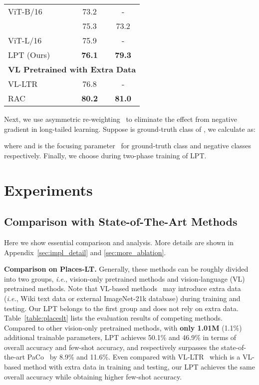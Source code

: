 \documentclass{article} \usepackage{iclr2023_conference,times}
\begin{document}
\begin{table}[h]
\begin{minipage}[t]{0.44\textwidth}
{{\begin{tabular}{l|cc}
      ViT-B/16 & 73.2 & - \\
      \citet{iscen2021class} & 75.3 & 73.2 \\
      ViT-L/16 & 75.9 & - \\
      LPT (Ours) & \textbf{76.1} & \textbf{79.3} \\
      \midrule
      \multicolumn{3}{l}{\textbf{VL Pretrained with Extra Data}} \\
      \midrule
      VL-LTR & 76.8 & - \\
      RAC & \textbf{80.2} & \textbf{81.0} \\
      \bottomrule
   \end{tabular}}}
   \label{table:comp_inat18}
\end{minipage}
\vspace{-1em}
\end{table}
Next, we use asymmetric re-weighting~\citep{ridnik2021asymmetric} to eliminate the effect from negative gradient in long-tailed learning.
Suppose  is ground-truth class of , we calculate  as:

where  and  is the focusing parameter~\citep{lin2017focal} for ground-truth class and negative classes respectively.
Finally, we choose  during two-phase training of LPT.

\section{Experiments}\label{sec:exp}
\vspace{-0.5em}


\subsection{Comparison with State-of-The-Art Methods}\label{sec:comp_sota}
\vspace{-0.5em}
Here we show essential comparison and analysis. More details are shown in Appendix~\ref{sec:impl_detail} and \ref{sec:more_ablation}.

\textbf{Comparison on Places-LT. }
Generally, these methods can be roughly divided into two groups, \textit{i.e.}, vision-only pretrained methods and vision-language (VL) pretrained methods. Note that VL-based methods~\citep{tian2021vl,Long2022,ma2021simple} may introduce extra data (\textit{i.e.}, Wiki text data or external ImageNet-21k database) during training and testing. Our LPT belongs to the first group and does not rely on extra data.
Table~\ref{table:placeslt} lists the evaluation results of competing methods. Compared to other vision-only pretrained methods, with \textbf{only 1.01M} (1.1\%) additional trainable parameters, LPT achieves 50.1\% and 46.9\% in terms of overall accuracy and few-shot accuracy, and respectively surpasses the state-of-the-art PaCo~\citep{cui2021parametric} by 8.9\% and 11.6\%. Even compared with VL-LTR~\citep{tian2021vl} which is a VL-based method with extra data in training and testing, our LPT achieves the same overall accuracy while  obtaining higher few-shot accuracy.  
\end{document}
